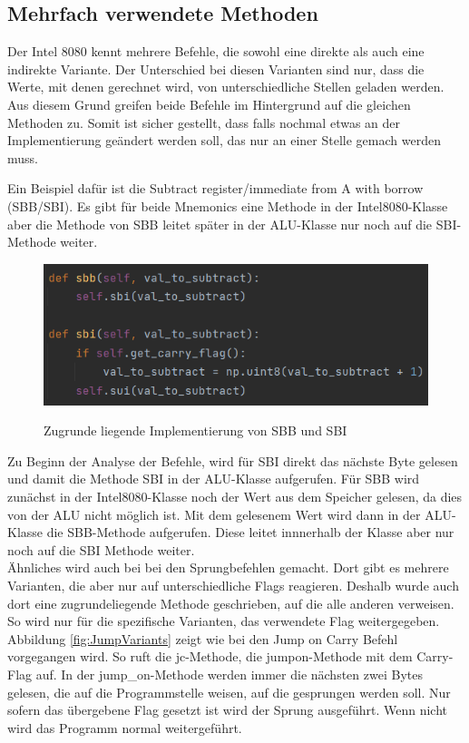\documentclass[12pt]{article}
\newcommand{\imgSpaceBefore}{\\[0.2cm]}
\begin{document}
\subsection{Mehrfach verwendete Methoden}

Der Intel 8080 kennt mehrere Befehle, die sowohl eine direkte als auch eine indirekte Variante. Der Unterschied bei diesen Varianten sind nur, dass die Werte, mit denen gerechnet wird, von unterschiedliche Stellen geladen werden. Aus diesem Grund greifen beide Befehle im Hintergrund auf die gleichen Methoden zu. Somit ist sicher gestellt, dass falls nochmal etwas an der Implementierung geändert werden soll, das nur an einer Stelle gemach werden muss.

Ein Beispiel dafür ist die \glqq Subtract register/immediate from A with borrow (SBB/SBI)\grqq. Es gibt für beide Mnemonics eine Methode in der Intel8080-Klasse aber die Methode von SBB leitet später in der ALU-Klasse nur noch auf die SBI-Methode weiter.
\imgSpaceBefore

\begin{figure}[h]
\caption{Zugrunde liegende Implementierung von SBB und SBI}
\centering
\includegraphics[width=15cm]{Bilder/DoubleUsedMethodSubtract}
\label{fig:DoubleUsedMethodSubtract}
\end{figure}

Zu Beginn der Analyse der Befehle, wird für SBI direkt das nächste Byte gelesen und damit die Methode SBI in der ALU-Klasse aufgerufen. Für SBB wird zunächst in der Intel8080-Klasse noch der Wert aus dem Speicher gelesen, da dies von der ALU nicht möglich ist. Mit dem gelesenem Wert wird dann in der ALU-Klasse die SBB-Methode aufgerufen. Diese leitet innnerhalb der Klasse aber nur noch auf die SBI Methode weiter.
\\

Ähnliches wird auch bei bei den Sprungbefehlen gemacht. Dort gibt es mehrere Varianten, die aber nur auf unterschiedliche Flags reagieren. Deshalb wurde auch dort eine zugrundeliegende Methode geschrieben, auf die alle anderen verweisen. So wird nur für die spezifische Varianten, das verwendete Flag weitergegeben.  Abbildung \ref{fig:JumpVariants} zeigt wie bei den Jump on Carry Befehl vorgegangen wird. So ruft die jc-Methode, die jump\-on-Methode mit dem Carry-Flag auf. In der jump\_on-Methode werden immer die nächsten zwei Bytes gelesen, die auf die Programmstelle weisen, auf die gesprungen werden soll. Nur sofern das übergebene Flag gesetzt ist wird der Sprung ausgeführt. Wenn nicht wird das Programm normal weitergeführt.
\imgSpaceBefore
\end{document}
